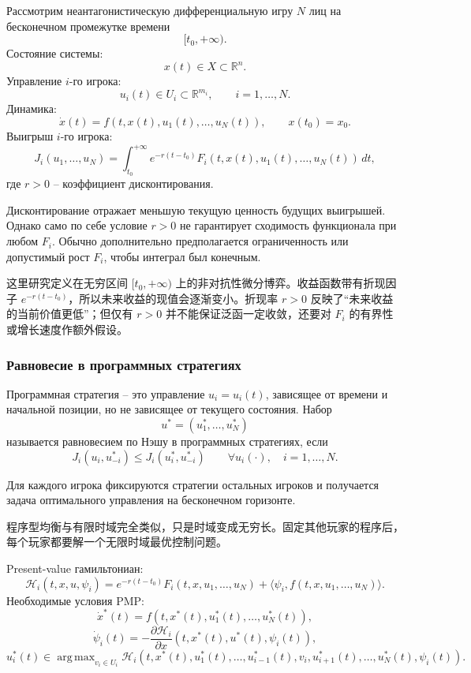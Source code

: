 \documentclass[12pt,a4paper]{article}
\newcommand{\R}{\mathbb{R}}
\DeclareMathOperator*{\argmax}{arg\,max}
\newcommand{\zh}[1]{\par\noindent #1\par}
\begin{document}


Рассмотрим неантагонистическую дифференциальную игру $N$ лиц на бесконечном промежутке времени
\[
 [t_0,+\infty).
\]
Состояние системы:
\[
 x(t)\in X\subset\R^n.
\]
Управление $i$-го игрока:
\[
 u_i(t)\in U_i\subset\R^{m_i},\qquad i=1,\ldots,N.
\]
Динамика:
\[
 \dot x(t)=f(t,x(t),u_1(t),\ldots,u_N(t)),\qquad x(t_0)=x_0.
\]
Выигрыш $i$-го игрока:
\[
 J_i(u_1,\ldots,u_N)=\int_{t_0}^{+\infty}e^{-r(t-t_0)}F_i(t,x(t),u_1(t),\ldots,u_N(t))\,dt,
\]
где $r>0$ -- коэффициент дисконтирования.

Дисконтирование отражает меньшую текущую ценность будущих выигрышей. Однако само по себе условие $r>0$ не гарантирует сходимость функционала при любом $F_i$. Обычно дополнительно предполагается ограниченность или допустимый рост $F_i$, чтобы интеграл был конечным.
\zh{这里研究定义在无穷区间 \([t_0,+\infty)\) 上的非对抗性微分博弈。收益函数带有折现因子 \(e^{-r(t-t_0)}\)，所以未来收益的现值会逐渐变小。折现率 \(r>0\) 反映了“未来收益的当前价值更低”；但仅有 \(r>0\) 并不能保证泛函一定收敛，还要对 \(F_i\) 的有界性或增长速度作额外假设。}

\subsubsection{Равновесие в программных стратегиях}

Программная стратегия -- это управление $u_i=u_i(t)$, зависящее от времени и начальной позиции, но не зависящее от текущего состояния. Набор
\[
 u^*=(u_1^*,\ldots,u_N^*)
\]
называется равновесием по Нэшу в программных стратегиях, если
\[
 J_i(u_i,u_{-i}^*)\le J_i(u_i^*,u_{-i}^*)\qquad \forall u_i(\cdot),\quad i=1,\ldots,N.
\]

Для каждого игрока фиксируются стратегии остальных игроков и получается задача оптимального управления на бесконечном горизонте.
\zh{程序型均衡与有限时域完全类似，只是时域变成无穷长。固定其他玩家的程序后，每个玩家都要解一个无限时域最优控制问题。}

Present-value гамильтониан:
\[
 \mathcal H_i(t,x,u,\psi_i)=e^{-r(t-t_0)}F_i(t,x,u_1,\ldots,u_N)+\langle\psi_i,f(t,x,u_1,\ldots,u_N)\rangle.
\]
Необходимые условия PMP:
\[
 \dot x^*(t)=f(t,x^*(t),u_1^*(t),\ldots,u_N^*(t)),
\]
\[
 \dot\psi_i(t)=-\frac{\partial\mathcal H_i}{\partial x}(t,x^*(t),u^*(t),\psi_i(t)),
\]
\[
 u_i^*(t)\in\argmax_{v_i\in U_i}\mathcal H_i(t,x^*(t),u_1^*(t),\ldots,u_{i-1}^*(t),v_i,u_{i+1}^*(t),\ldots,u_N^*(t),\psi_i(t)).
\]
\end{document}

